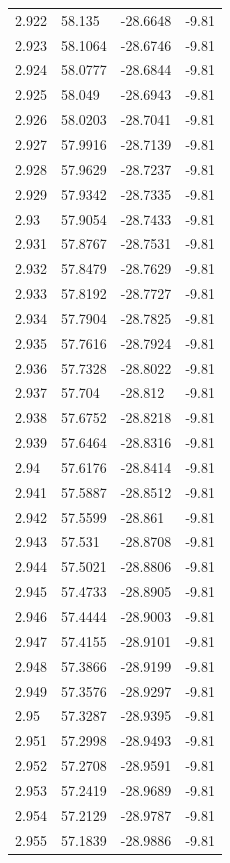 \begin{tabular}{llll}
2.922 & 58.135 & -28.6648 & -9.81 \\
2.923 & 58.1064 & -28.6746 & -9.81 \\
2.924 & 58.0777 & -28.6844 & -9.81 \\
2.925 & 58.049 & -28.6943 & -9.81 \\
2.926 & 58.0203 & -28.7041 & -9.81 \\
2.927 & 57.9916 & -28.7139 & -9.81 \\
2.928 & 57.9629 & -28.7237 & -9.81 \\
2.929 & 57.9342 & -28.7335 & -9.81 \\
2.93 & 57.9054 & -28.7433 & -9.81 \\
2.931 & 57.8767 & -28.7531 & -9.81 \\
2.932 & 57.8479 & -28.7629 & -9.81 \\
2.933 & 57.8192 & -28.7727 & -9.81 \\
2.934 & 57.7904 & -28.7825 & -9.81 \\
2.935 & 57.7616 & -28.7924 & -9.81 \\
2.936 & 57.7328 & -28.8022 & -9.81 \\
2.937 & 57.704 & -28.812 & -9.81 \\
2.938 & 57.6752 & -28.8218 & -9.81 \\
2.939 & 57.6464 & -28.8316 & -9.81 \\
2.94 & 57.6176 & -28.8414 & -9.81 \\
2.941 & 57.5887 & -28.8512 & -9.81 \\
2.942 & 57.5599 & -28.861 & -9.81 \\
2.943 & 57.531 & -28.8708 & -9.81 \\
2.944 & 57.5021 & -28.8806 & -9.81 \\
2.945 & 57.4733 & -28.8905 & -9.81 \\
2.946 & 57.4444 & -28.9003 & -9.81 \\
2.947 & 57.4155 & -28.9101 & -9.81 \\
2.948 & 57.3866 & -28.9199 & -9.81 \\
2.949 & 57.3576 & -28.9297 & -9.81 \\
2.95 & 57.3287 & -28.9395 & -9.81 \\
2.951 & 57.2998 & -28.9493 & -9.81 \\
2.952 & 57.2708 & -28.9591 & -9.81 \\
2.953 & 57.2419 & -28.9689 & -9.81 \\
2.954 & 57.2129 & -28.9787 & -9.81 \\
2.955 & 57.1839 & -28.9886 & -9.81 \\

\end{tabular}
